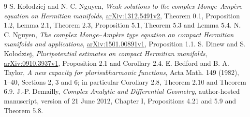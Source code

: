 \documentclass[11pt]{article}
\theoremstyle{remark}\newtheorem{remark}[theorem]{Remark}
\begin{document}
\begin{thebibliography}{9}
 S. Ko\l odziej and N. C. Nguyen,
\emph{Weak solutions to the complex Monge--Amp\`ere equation on Hermitian
manifolds}, \href{https://arxiv.org/abs/1312.5491v2}{arXiv:1312.5491v2},
Theorem 0.1, Proposition 1.2, Lemma 2.1, Theorem 2.3,
Proposition 5.1, Theorem 5.3 and Lemma 5.4.
 N. C. Nguyen,
\emph{The complex Monge--Amp\`ere type equation on compact Hermitian
manifolds and applications},
\href{https://arxiv.org/abs/1501.00891v1}{arXiv:1501.00891v1}, Proposition 1.1.
 S. Dinew and S. Ko\l odziej,
\emph{Pluripotential estimates on compact Hermitian manifolds},
\href{https://arxiv.org/abs/0910.3937v1}{arXiv:0910.3937v1},
Proposition 2.1 and Corollary 2.4.
 E. Bedford and B. A. Taylor,
\emph{A new capacity for plurisubharmonic functions}, Acta Math.
149 (1982), 1--40, Sections 2, 3 and 6; in particular
Corollary 2.8, Theorem 2.10 and Theorem 6.9.
 J.-P. Demailly,
\emph{Complex Analytic and Differential Geometry}, author-hosted
manuscript, version of 21 June 2012, Chapter I, Propositions 4.21 and 5.9
and Theorem 5.8.
\end{thebibliography}
\end{document}

